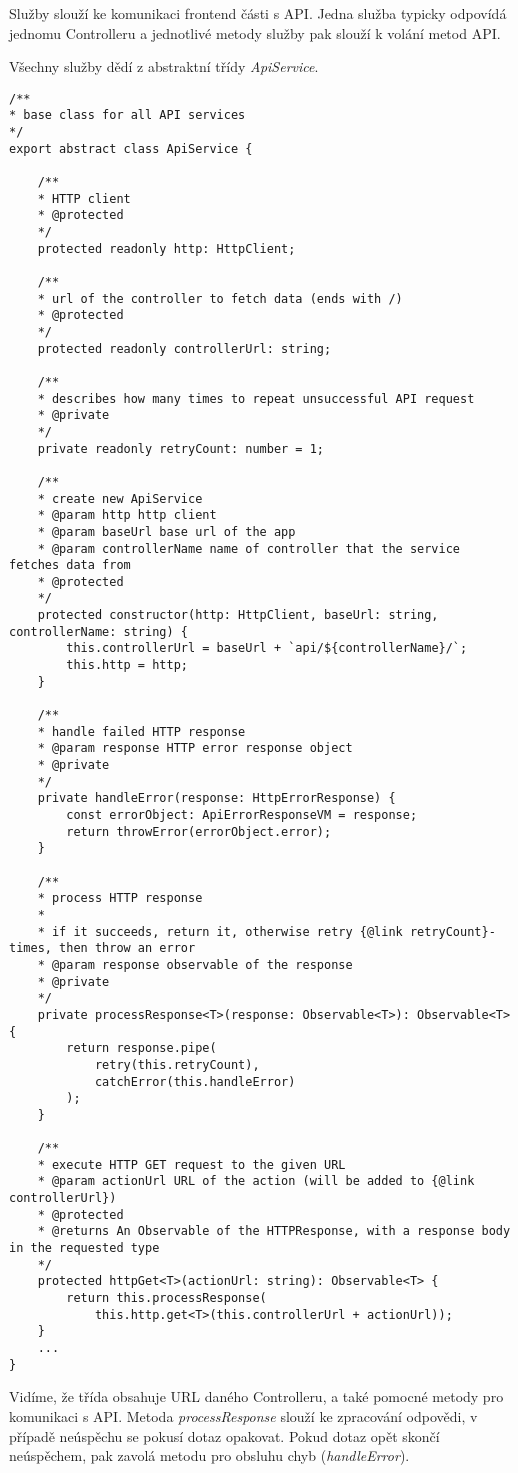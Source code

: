 Služby slouží ke komunikaci frontend části s API. Jedna služba typicky odpovídá jednomu Controlleru a jednotlivé metody služby pak slouží k volání metod API. 

Všechny služby dědí z abstraktní třídy \textit{ApiService}. 

\begin{lstlisting}
/**
* base class for all API services
*/
export abstract class ApiService {

	/**
	* HTTP client
	* @protected
	*/
	protected readonly http: HttpClient;
	
	/**
	* url of the controller to fetch data (ends with /)
	* @protected
	*/
	protected readonly controllerUrl: string;
	
	/**
	* describes how many times to repeat unsuccessful API request
	* @private
	*/
	private readonly retryCount: number = 1;
	
	/**
	* create new ApiService
	* @param http http client
	* @param baseUrl base url of the app
	* @param controllerName name of controller that the service fetches data from
	* @protected
	*/
	protected constructor(http: HttpClient, baseUrl: string, controllerName: string) {
		this.controllerUrl = baseUrl + `api/${controllerName}/`;
		this.http = http;
	}
	
	/**
	* handle failed HTTP response
	* @param response HTTP error response object
	* @private
	*/
	private handleError(response: HttpErrorResponse) {
		const errorObject: ApiErrorResponseVM = response;
		return throwError(errorObject.error);
	}
	
	/**
	* process HTTP response
	*
	* if it succeeds, return it, otherwise retry {@link retryCount}-times, then throw an error
	* @param response observable of the response
	* @private
	*/
	private processResponse<T>(response: Observable<T>): Observable<T> {
		return response.pipe(
			retry(this.retryCount),
			catchError(this.handleError)
		);
	}
	
	/**
	* execute HTTP GET request to the given URL
	* @param actionUrl URL of the action (will be added to {@link controllerUrl})
	* @protected
	* @returns An Observable of the HTTPResponse, with a response body in the requested type
	*/
	protected httpGet<T>(actionUrl: string): Observable<T> {
		return this.processResponse(
			this.http.get<T>(this.controllerUrl + actionUrl));
	}
	...
}
\end{lstlisting}

Vidíme, že třída obsahuje URL daného Controlleru, a také pomocné metody pro komunikaci s API. Metoda \textit{processResponse} slouží ke zpracování odpovědi, v případě neúspěchu se pokusí dotaz opakovat. Pokud dotaz opět skončí neúspěchem, pak zavolá metodu pro obsluhu chyb (\textit{handleError}).


